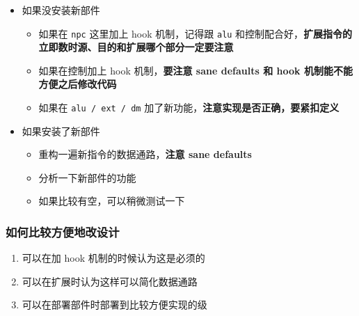 \begin{itemize}
\tightlist
\item
  如果没安装新部件

  \begin{itemize}
  \tightlist
  \item
    如果在 \texttt{npc} 这里加上 hook 机制，记得跟 \texttt{alu}
    和控制配合好，\textbf{扩展指令的立即数时源、目的和扩展哪个部分一定要注意}
  \item
    如果在控制加上 hook 机制，\textbf{要注意 sane defaults 和 hook
    机制能不能方便之后修改代码}
  \item
    如果在 \texttt{alu\ /\ ext\ /\ dm}
    加了新功能，\textbf{注意实现是否正确，要紧扣定义}
  \end{itemize}
\item
  如果安装了新部件

  \begin{itemize}
  \tightlist
  \item
    重构一遍新指令的数据通路，\textbf{注意 sane defaults}
  \item
    分析一下新部件的功能
  \item
    如果比较有空，可以稍微测试一下
  \end{itemize}
\end{itemize}

\hypertarget{ux5982ux4f55ux6bd4ux8f83ux65b9ux4fbfux5730ux6539ux8bbeux8ba1}{%
\subsubsection{如何比较方便地改设计}\label{ux5982ux4f55ux6bd4ux8f83ux65b9ux4fbfux5730ux6539ux8bbeux8ba1}}

\begin{enumerate}
\def\labelenumi{\arabic{enumi}.}
\tightlist
\item
  可以在加 hook 机制的时候认为这是必须的
\item
  可以在扩展时认为这样可以简化数据通路
\item
  可以在部署部件时部署到比较方便实现的级
\end{enumerate}
